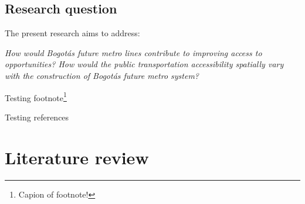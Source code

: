 \documentclass[12pt, a4paper]{report}
\begin{document}
\section{Research question}

The present research aims to address:







\begin{center}
    \textit{How would Bogot\'{a}\textquotesingle s future metro lines contribute to improving access to opportunities? How would the public transportation accessibility spatially vary with the construction of Bogot\'{a}\textquotesingle s future metro system?}
\end{center}




Testing footnote\footnote{Capion of footnote!}

Testing references \citep{alcaldiamayordebogotad.c.EstacionesPrimeraLinea2022}


\chapter{Literature review} \label{Chap2}
\end{document}
